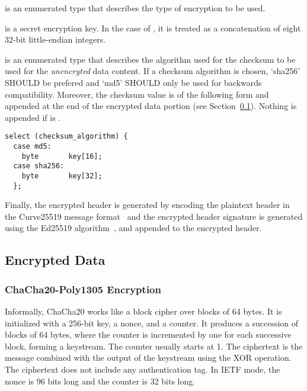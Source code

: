 is an enumerated type that describes the type of encryption to be used.

 is a secret encryption key.
%
In the case of , it is treated as a
concatenation of eight 32-bit little-endian integers.

 is an enumerated type that describes the algorithm
used for the checksum to be used for the \emph{unencryted} data content.
%
If a checksum algorithm is chosen, `sha256' SHOULD be prefered and
`md5' SHOULD only be used for backwards compatibility.
%
Moreover, the checksum value is of the following form and appended at
the end of the encrypted data portion (see
Section~\ref{encrypted:data}). Nothing is appended if
 is .
%
\begin{verbatim}
select (checksum_algorithm) {
  case md5:
    byte       key[16];
  case sha256:
    byte       key[32];
  };
\end{verbatim}


Finally, the encrypted header is generated by encoding the plaintext
header in the Curve25519 message format~\cite{RFC7748} and
%
the encrypted header signature is generated using the Ed25519
algorithm~\cite{RFC8032}, and appended to the encrypted header.

\subsection{Encrypted Data}\label{encrypted:data}
\subsubsection{ChaCha20-Poly1305 Encryption}

Informally, ChaCha20 works like a block cipher over blocks of 64 bytes.
%
It is initialized with a 256-bit key, a nonce, and a counter.
%
It produces a succession of blocks of 64 bytes, where the counter is
incremented by one for each successive block, forming a keystream.
%
The counter usually starts at 1.
%
The ciphertext is the message combined with the output of the
keystream using the XOR operation.
%
The ciphertext does not include any authentication tag.
%
In IETF mode, the nonce is 96 bits long and the counter is 32 bits
long.

